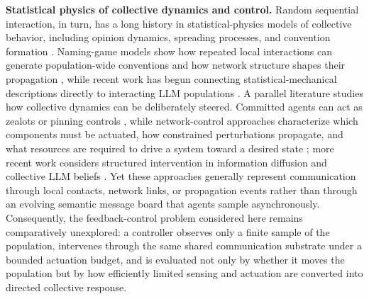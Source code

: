 \textbf{Statistical physics of collective dynamics and control.}
Random sequential interaction, in turn, has a long history in statistical-physics models of collective behavior, including opinion dynamics, spreading processes, and convention formation \citep{castellano2009statistical}. Naming-game models show how repeated local interactions can generate population-wide conventions and how network structure shapes their propagation \citep{baronchelli2006sharp,dallasta2006nonequilibrium}, while recent work has begun connecting statistical-mechanical descriptions directly to interacting LLM populations \citep{ashery2025emergent,el2026physics}. A parallel literature studies how collective dynamics can be deliberately steered. Committed agents can act as zealots or pinning controls \citep{masuda2015opinion}, while network-control approaches characterize which components must be actuated, how constrained perturbations propagate, and what resources are required to drive a system toward a desired state \citep{yan2012energy,cornelius2013realistic,ruths2014control,loiudice2015structural,liu2016control}; more recent work considers structured intervention in information diffusion and collective LLM beliefs \citep{chen2026community,he2026belief}. Yet these approaches generally represent communication through local contacts, network links, or propagation events rather than through an evolving semantic message board that agents sample asynchronously. Consequently, the feedback-control problem considered here remains comparatively unexplored: a controller observes only a finite sample of the population, intervenes through the same shared communication substrate under a bounded actuation budget, and is evaluated not only by whether it moves the population but by how efficiently limited sensing and actuation are converted into directed collective response.
